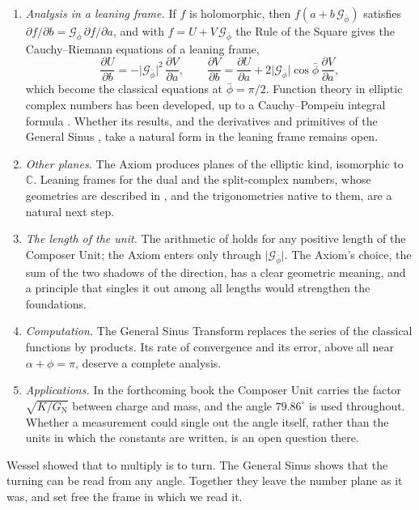 \documentclass[11pt,a4paper]{amsart}
\theoremstyle{plain}
\theoremstyle{definition}
\theoremstyle{remark}
\newcommand{\pb}{\bar{\phi}}                     %
\newcommand{\Gp}{\mathcal{G}_{\bar{\phi}}}       %
\newcommand{\C}{\mathbb{C}}
\begin{document}
\begin{enumerate}
  \item \emph{Analysis in a leaning frame.} If $f$ is holomorphic, then $f(a + b\,\Gp)$ satisfies $\partial f/\partial b = \Gp\,\partial f/\partial a$, and with $f = U + V\,\Gp$ the Rule of the Square gives the Cauchy--Riemann equations of a leaning frame,
  \[
  \frac{\partial U}{\partial b} = -\lvert\Gp\rvert^2\,\frac{\partial V}{\partial a} , \qquad \frac{\partial V}{\partial b} = \frac{\partial U}{\partial a} + 2\lvert\Gp\rvert\cos\pb\,\frac{\partial V}{\partial a} ,
  \]
  which become the classical equations at $\pb = \pi/2$. Function theory in elliptic complex numbers has been developed, up to a Cauchy--Pompeiu integral formula \citep{AlayonSolarzVanegas2010}. Whether its results, and the derivatives and primitives of the General Sinus \citep[Section~5]{Derraz2026GSP}, take a natural form in the leaning frame remains open.
  \item \emph{Other planes.} The Axiom produces planes of the elliptic kind, isomorphic to $\C$. Leaning frames for the dual and the split-complex numbers, whose geometries are described in \citep{Yaglom1968,HarkinHarkin2004}, and the trigonometries native to them, are a natural next step.
  \item \emph{The length of the unit.} The arithmetic of  holds for any positive length of the Composer Unit; the Axiom enters only through $\lvert\Gp\rvert$. The Axiom's choice, the sum of the two shadows of the direction, has a clear geometric meaning, and a principle that singles it out among all lengths would strengthen the foundations.
  \item \emph{Computation.} The General Sinus Transform replaces the series of the classical functions by products. Its rate of convergence and its error, above all near $\alpha + \phi = \pi$, deserve a complete analysis.
  \item \emph{Applications.} In the forthcoming book the Composer Unit carries the factor $\sqrt{K/G_{\mathrm{N}}}$ between charge and mass, and the angle $79.86^\circ$ is used throughout. Whether a measurement could single out the angle itself, rather than the units in which the constants are written, is an open question there.
\end{enumerate}

Wessel showed that to multiply is to turn. The General Sinus shows that the turning can be read from any angle. Together they leave the number plane as it was, and set free the frame in which we read it.
\end{document}
